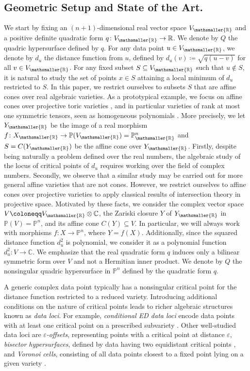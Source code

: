 \documentclass[11pt,reqno]{amsart}
\numberwithin{equation}{section}
\theoremstyle{plain}
\numberwithin{theorem}{section}
\theoremstyle{definition}
\renewcommand{\P}{\mathbb{P}}
\newcommand{\R}{\mathbb{R}}
\newcommand{\C}{\mathbb{C}}
\newcommand{\mR}{\mathsmaller{\mathbb{R}}}
\begin{document}
\subsection*{Geometric Setup and State of the Art.} We start by fixing an $(n+1)$-dimensional real vector space $V_\mR$ and a positive definite quadratic form $q\colon V_\mR\to\R$. We denote by $Q$ the quadric hypersurface defined by $q.$ For any data point $u\in V_\mR$, we denote by $d_u$ the distance function from $u$, defined by $d_u(v)\coloneqq\sqrt{q(u-v)}$ for all $v\in V_\mR$. For any fixed subset $S\subseteq V_\mR$ such that $u\notin S$, it is natural to study the set of points $x\in S$ attaining a local minimum of $d_u$ restricted to $S$. In this paper, we restrict ourselves to subsets $S$ that are affine cones over real algebraic varieties. As a prototypical example, we focus on affine cones over projective toric varieties \cite{Higher_duality_and_toric}, and in particular varieties of rank at most one symmetric tensors, seen as homogeneous polynomials \cite{banach1938uber}. More precisely, we let $Y_\mR$ be the image of a real morphism $f\colon X_\mR\to\P(V_\mR)=\P_{\mR}^n$ and $S=C(Y_\mR)$ be the affine cone over $Y_\mR$. Firstly, despite being naturally a problem defined over the real numbers, the algebraic study of the locus of critical points of $d_u$ requires working over the field of complex numbers. Secondly, we observe that a similar study may be carried out for more general affine varieties that are not cones. However, we restrict ourselves to affine cones over projective varieties to apply classical results of intersection theory in projective space. Motivated by these facts, we consider the complex vector space $V\coloneqq V_\mR\otimes\C$, the Zariski closure $Y$ of $Y_\mR$ in $\P(V)=\P^n$, and its affine cone $C(Y)\subseteq V$. In particular, we will always work with morphisms $f\colon X\to\P^n$, where $Y=f(X)$. Additionally, since the squared distance function $d_u^2$ is polynomial, we consider it as a polynomial function $d_u^2\colon V\to\C$. We emphasize that the real quadratic form $q$ induces only a bilinear symmetric form over $V$ and not a Hermitian inner product. We denote by $Q$ the nonsingular quadric hypersurface in $\P^n$ defined by the quadratic form $q$.

A generic complex data point typically has a nonsingular critical point for the distance function restricted to a reduced variety. Introducing additional conditions on the nature of critical points leads to richer algebraic structures known as {\em data loci}. For example, {\em conditional ED data loci} encode data points with at least one critical point on a prescribed subvariety \cite{horobet2017data,horobet2022data,dirocco2024Relative}. Other well-studied data loci are {\em $\varepsilon$-offsets}, representing points with a critical point at distance $\varepsilon$, {\em bisector hypersurfaces}, defined by data having two equidistant critical points \cite{horobet2019offset,ottaviani2020distance}, and {\em Voronoi cells}, consisting of all data points closest to a fixed point lying on a given variety \cite{cifuentes2022voronoi}.
\end{document}
